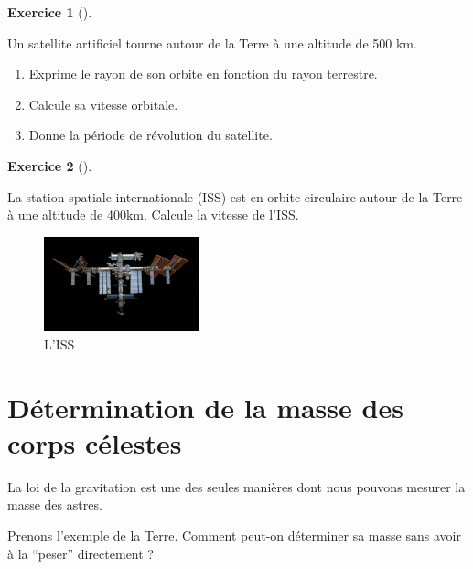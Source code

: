 \documentclass[
  letterpaper,
  DIV=11,
  numbers=noendperiod]{scrartcl}
\providecommand{\tightlist}{%
  \setlength{\itemsep}{0pt}\setlength{\parskip}{0pt}}\usepackage{longtable,booktabs,array}
\theoremstyle{definition}
\newtheorem{exercise}{Exercice}[section]
\theoremstyle{definition}
\theoremstyle{definition}
\theoremstyle{remark}
\begin{document}
\begin{exercise}[]\protect\hypertarget{exr-vitesse-orbitale}{}\label{exr-vitesse-orbitale}

Un satellite artificiel tourne autour de la Terre à une altitude de 500
km.

\begin{enumerate}
\def\labelenumi{\arabic{enumi}.}
\tightlist
\item
  Exprime le rayon de son orbite en fonction du rayon terrestre.
\item
  Calcule sa vitesse orbitale.
\item
  Donne la période de révolution du satellite.
\end{enumerate}

\end{exercise}

\begin{exercise}[]\protect\hypertarget{exr-iss}{}\label{exr-iss}

La station spatiale internationale (ISS) est en orbite circulaire autour
de la Terre à une altitude de 400km. Calcule la vitesse de l'ISS.

\end{exercise}

\begin{figure}[H]

{\centering \includegraphics[width=0.4\textwidth,height=\textheight]{figures/grav/iss.pdf}

}

\caption{L'ISS}

\end{figure}%

\section{Détermination de la masse des corps
célestes}\label{duxe9termination-de-la-masse-des-corps-cuxe9lestes}

La loi de la gravitation est une des seules manières dont nous pouvons
mesurer la masse des astres.

Prenons l'exemple de la Terre. Comment peut-on déterminer sa masse sans
avoir à la ``peser'' directement ?
\end{document}
